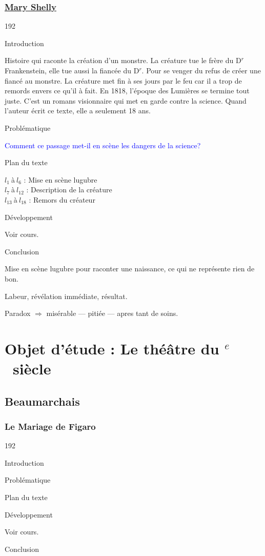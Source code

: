 \documentclass[12pt,a4paper]{article}
\begin{document}
				\subsubsection{\href{.extra/Bio/Shelly.pdf}{Mary Shelly}}
\begin{dingautolist}{192}

\item Introduction \par
Histoire qui raconte la création d'un monstre. La créature tue le frère du D$^r$ Frankenstein, elle tue aussi la fiancée du D$^r$. Pour se venger du refus de créer une fiancé au monstre. La créature met fin à ses jours par le feu car il a trop de remords envers ce qu'il à fait. En 1818, l'époque des Lumières se termine tout juste. C'est un romans visionnaire qui met en garde contre la science. Quand l'auteur écrit ce texte, elle a seulement 18 ans.
\item Probl\'ematique \par
	\textcolor{blue}{Comment ce passage met-il en scène les dangers de la science?}
\item Plan du texte \par
	$l_{1}~$\`a$~l_{6}$ : Mise en scène lugubre\\
    $l_{7}~$\`a$~l_{12}$ : Description de la créature\\
    $l_{13}~$\`a$~l_{18}$ : Remors du créateur


\item D\'eveloppement \par
        Voir cours.

\item Conclusion \par
Mise en scène lugubre pour raconter une naissance, ce qui ne représente rien de bon.\par
Labeur, révélation immédiate, résultat.\par
Paradox $\Rightarrow$ misérable --- pitiée --- apres tant de soins.


\end{dingautolist}

 \newpage

		\section[La com\'edie du valet]{Objet d'\'etude : Le th\'e\^atre du \textsc{}$^{e}$~siècle}
			\subsection{Beaumarchais}
				\subsubsection{Le Mariage de Figaro}
\begin{dingautolist}{192}

\item Introduction \par
\item Probl\'ematique \par
\item Plan du texte \par
\item D\'eveloppement \par
        Voir cours.

\item Conclusion \par

\end{dingautolist}		
 \newpage
\end{document}
